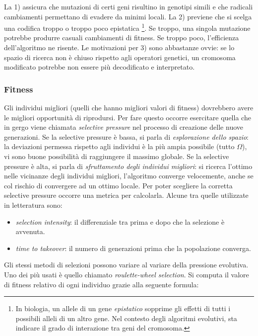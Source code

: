 \documentclass[10pt,a4paper]{article}
\begin{document}
La 1) assicura che mutazioni di certi geni risultino in genotipi simili e che radicali cambiamenti permettano di evadere da minimi locali. La 2) previene che si scelga una codifica troppo o troppo poco epistatica \footnote{In biologia, un allele di un gene \emph{epistatico} sopprime gli effetti di tutti i possibili alleli di un altro gene. Nel contesto degli algoritmi evolutivi, sta indicare il grado di interazione tra geni del cromosoma.}. Se troppo, una singola mutazione potrebbe produrre casuali cambiamenti di fitness. Se troppo poco, l'efficienza dell'algoritmo ne risente. Le motivazioni per 3) sono abbastanze ovvie: se lo spazio di ricerca non è chiuso rispetto agli operatori genetici, un cromosoma modificato potrebbe non essere più decodificato e interpretato.  

\subsubsection{Fitness}

Gli individui migliori (quelli che hanno migliori valori di fitness) dovrebbero avere le migliori opportunità di riprodursi. Per fare questo occorre esercitare quella che in gergo viene chiamata \emph{selective pressure} nel processo di creazione delle nuove generazioni. Se la selective pressure è bassa, si parla di \emph{esplorazione dello spazio}: la deviazioni permessa rispetto agli individui è la più ampia possibile (tutto $\Omega$), vi sono buone possibilità di raggiungere il massimo globale. Se la selective pressure è alta, si parla di \emph{sfruttamento degli individui migliori}: si ricerca l'ottimo nelle vicinanze degli individui migliori, l'algoritmo converge velocemente, anche se col rischio di convergere ad un ottimo locale. Per poter scegliere la corretta selective pressure occorre una metrica per calcolarla. Alcune tra quelle utilizzate in letteratura sono:
\begin{itemize}
\item{\emph{selection intensity}: il differenziale tra prima e dopo che la selezione è avvenuta.}
\item{\emph{time to takeover}: il numero di generazioni prima che la popolazione converga.}
\end{itemize} 

Gli stessi metodi di selezioni possono variare al variare della pressione evolutiva. Uno dei più usati è quello chiamato \emph{roulette-wheel selection}. Si computa il valore di fitness relativo di ogni individuo grazie alla seguente formula:
\end{document}
